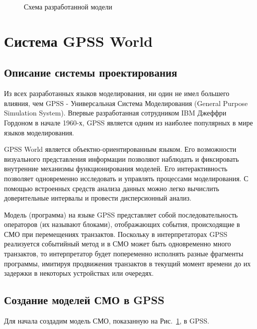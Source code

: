 \documentclass[a4paper,14pt]{report} %
\begin{document}
\begin{figure}[h] %
\caption{Схема разработанной модели}
\label{ris:model}
\end{figure} %

\section{Система GPSS World}
\subsection{Описание системы проектирования}
Из всех разработанных языков моделирования, ни один не имел большего влияния, чем GPSS - Универсальная Система Моделирования (General Purpose Simulation System). Впервые разработанная сотрудником IBM Джеффри Гордоном в начале 1960-х, GPSS является одним из наиболее популярных в мире языков моделирования.

GPSS World является объектно-ориентированным языком. Его возможности визуального представления информации позволяют наблюдать и фиксировать внутренние механизмы функционирования моделей. Его интерактивность позволяет одновременно исследовать и управлять процессами моделирования. С помощью встроенных средств анализа данных можно легко вычислить доверительные интервалы и провести дисперсионный анализ.

Модель (программа) на языке GPSS представляет собой последовательность операторов (их называют блоками), отображающих события, происходящие в СМО при перемещениях транзактов. Поскольку в интерпретаторах GPSS реализуется событийный метод и в СМО может быть одновременно много транзактов, то интерпретатор будет попеременно исполнять разные фрагменты программы, имитируя продвижения транзактов в текущий момент времени до их задержки в некоторых устройствах или очередях.

\subsection{Создание моделей СМО в GPSS}
Для начала создадим модель СМО, показанную на Рис.~\ref{ris:model}, в GPSS.
\end{document}
